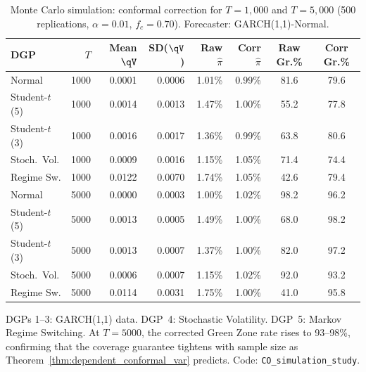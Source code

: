 \begin{table}[htbp]
\centering
\caption{Monte Carlo simulation: conformal correction for $T=1{,}000$ and $T=5{,}000$ (500 replications, $\alpha=0.01$, $f_c=0.70$). Forecaster: GARCH(1,1)-Normal.}
\label{tab:simulation_extended}
\scriptsize
\begin{tabular}{@{}lrrrrrcc@{}}
\toprule
DGP & $T$ & Mean $\qV$ & SD($\qV$) & Raw $\hat{\pi}$ & Corr $\hat{\pi}$ & Raw Gr.\% & Corr Gr.\% \\
\midrule
Normal        & 1000 & 0.0001 & 0.0006 & 1.01\% & 0.99\% & 81.6 & 79.6 \\
Student-$t$(5) & 1000 & 0.0014 & 0.0013 & 1.47\% & 1.00\% & 55.2 & 77.8 \\
Student-$t$(3) & 1000 & 0.0016 & 0.0017 & 1.36\% & 0.99\% & 63.8 & 80.6 \\
Stoch.\ Vol.  & 1000 & 0.0009 & 0.0016 & 1.15\% & 1.05\% & 71.4 & 74.4 \\
Regime Sw.    & 1000 & 0.0122 & 0.0070 & 1.74\% & 1.05\% & 42.6 & 79.4 \\
\midrule
Normal        & 5000 & 0.0000 & 0.0003 & 1.00\% & 1.02\% & 98.2 & 96.2 \\
Student-$t$(5) & 5000 & 0.0013 & 0.0005 & 1.49\% & 1.00\% & 68.0 & 98.2 \\
Student-$t$(3) & 5000 & 0.0013 & 0.0007 & 1.37\% & 1.00\% & 82.0 & 97.2 \\
Stoch.\ Vol.  & 5000 & 0.0006 & 0.0007 & 1.15\% & 1.02\% & 92.0 & 93.2 \\
Regime Sw.    & 5000 & 0.0114 & 0.0031 & 1.75\% & 1.00\% & 41.0 & 95.8 \\
\bottomrule
\end{tabular}
\begin{minipage}{\linewidth}\scriptsize
\smallskip
DGPs 1--3: GARCH(1,1) data. DGP~4: Stochastic Volatility. DGP~5: Markov Regime Switching. At $T=5000$, the corrected Green Zone rate rises to 93--98\%, confirming that the coverage guarantee tightens with sample size as Theorem~\ref{thm:dependent_conformal_var} predicts. Code: \texttt{CO\_simulation\_study}.
\end{minipage}
\end{table}
